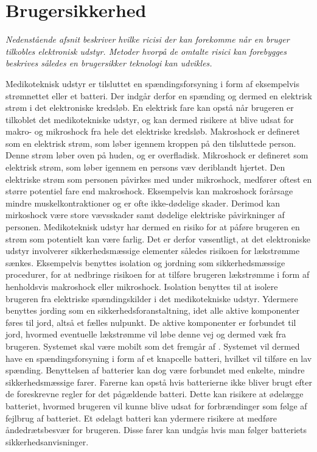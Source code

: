 \section{Brugersikkerhed}
\textit{Nedenstående afsnit beskriver hvilke ricisi der kan forekomme når en bruger tilkobles elektronisk udstyr. Metoder hvorpå de omtalte risici kan forebygges beskrives således en brugersikker teknologi kan udvikles.}

Medikoteknisk udstyr er tilsluttet en spændingsforsyning i form af eksempelvis strømnettet eller et batteri. Der indgår derfor en spænding og dermed en elektrisk strøm i det elektroniske kredsløb. En elektrisk fare kan opstå når brugeren er tilkoblet det medikotekniske udstyr, og kan dermed risikere at blive udsat for makro- og mikroshock fra hele det elektriske kredsløb. Makroshock er defineret som en elektrisk strøm, som løber igennem kroppen på den tilsluttede person. Denne strøm løber oven på huden, og er overfladisk. Mikroshock er defineret som elektrisk strøm, som løber igennem en persons væv deriblandt hjertet. Den elektriske strøm som personen påvirkes med under mikroshock, medfører oftest en større potentiel fare end makroshock. Eksempelvis kan makroshock forårsage mindre muskelkontraktioner og er ofte ikke-dødelige skader. Derimod kan mirkoshock være store vævsskader samt dødelige elektriske påvirkninger af personen. \citep{Webster2011} \newline
Medikoteknisk udstyr har dermed en risiko for at påføre brugeren en strøm som potentielt kan være farlig. Det er derfor væsentligt, at det elektroniske udstyr involverer sikkerhedsmæssige elementer således risikoen for lækstrømme sænkes. Eksempelvis benyttes isolation og jordning som sikkerhedsmæssige procedurer, for at nedbringe risikoen for at tilføre brugeren lækstrømme i form af henholdsvis makroshock eller mikroshock. Isolation benyttes til at isolere brugeren fra elektriske spændingskilder i det medikotekniske udstyr. Ydermere benyttes jording som en sikkerhedsforanstaltning, idet alle aktive komponenter føres til jord, altså et fælles nulpunkt. De aktive komponenter er forbundet til jord, hvormed eventuelle lækstrømme vil løbe denne vej og dermed væk fra brugeren. \citep{Webster2011} \newline 
Systemet skal være mobilt som det fremgår af . Systemet vil dermed have en spændingsforsyning i form af et knapcelle batteri, hvilket vil tilføre en lav spænding. Benyttelsen af batterier kan dog være forbundet med enkelte, mindre sikkerhedsmæssige farer. Farerne kan opstå hvis batterierne ikke bliver brugt efter de foreskrevne regler for det pågældende batteri. Dette kan risikere at ødelægge batteriet, hvormed brugeren vil kunne blive udsat for forbrændinger som følge af fejlbrug af batteriet. Et ødelagt batteri kan ydermere risikere at medføre åndedrætsbesvær for brugeren. Disse farer kan undgås hvis man følger batteriets sikkerhedsanvisninger. \citep{NREL2011}


